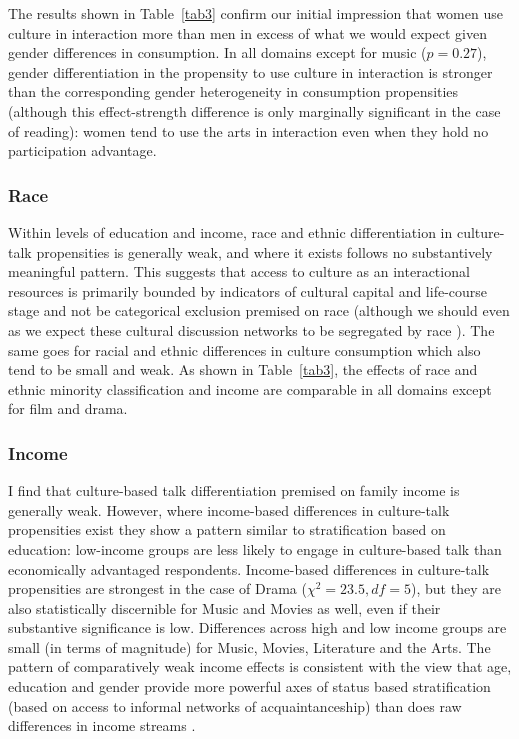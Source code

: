 \documentclass[11pt]{article}
\begin{document}
The results shown in Table~\ref{tab3} confirm our initial impression that women use culture in interaction more than men in excess of what we would expect given gender differences in consumption.  In all domains except for music ($p=0.27$), gender differentiation in the propensity to use culture in interaction is stronger than the corresponding gender heterogeneity in consumption propensities (although this effect-strength difference is only marginally significant in the case of reading):  women tend to use the arts in interaction even when they hold no participation advantage. 

\subsubsection{Race}
Within levels of education and income, race and ethnic differentiation in culture-talk propensities is generally weak, and where it exists follows no substantively meaningful pattern. This suggests that access to culture as an interactional resources is primarily bounded by indicators of cultural capital and life-course stage and not be categorical exclusion premised on race (although we should even as we expect these cultural discussion networks to be segregated by race \citep{carter03, dimaggio_ostrower90}).  The same goes for racial and ethnic differences in culture consumption which also tend to be small and weak.  As shown in Table~\ref{tab3}, the effects of race and ethnic minority classification and income are comparable in all domains except for film and drama. 

\subsubsection{Income}
 I find that culture-based talk differentiation premised on family income is generally weak.   However, where income-based differences in culture-talk propensities exist they show a pattern similar to stratification based on education: low-income groups are less likely to engage in culture-based talk than economically advantaged respondents.   Income-based differences in culture-talk propensities are strongest in the case of Drama ($\chi^{2}=23.5, df=5$), but they are also statistically discernible for Music and Movies as well, even if their substantive significance is low. Differences across high and low income groups are small (in terms of magnitude) for Music, Movies, Literature and the Arts.   The pattern of comparatively weak income effects is consistent with the view that age, education and gender provide more powerful axes of status based stratification (based on access to informal networks of acquaintanceship) than does raw differences in income streams  \citep{dimaggio_useem78a}. 
\end{document}
